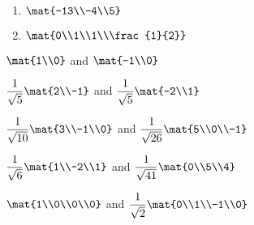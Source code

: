 \begin{exercises}
\begin{problist}
\begin{enumerate}
			\item $\mat{-13\\-4\\5}$
			\item $\mat{0\\1\\1\\\frac{1}{2}}$
		\end{enumerate}
		\begin{solution}
			\begin{enumerate*}
				\item $\mat{1\\0}$ and $\mat{-1\\0}$
				\item $\dfrac{1}{\sqrt{5}}\mat{2\\-1}$ and $\dfrac{1}{\sqrt{5}}\mat{-2\\1}$
				\item $\dfrac{1}{\sqrt{10}}\mat{3\\-1\\0}$ and $\dfrac{1}{\sqrt{26}}\mat{5\\0\\-1}$
				\item $\dfrac{1}{\sqrt{6}}\mat{1\\-2\\1}$ and $\dfrac{1}{\sqrt{41}}\mat{0\\5\\4}$
				\item $\mat{1\\0\\0\\0}$ and $\dfrac{1}{\sqrt{2}}\mat{0\\1\\-1\\0}$
			\end{enumerate*}
		\end{solution}
		

\end{problist}
\end{exercises}
